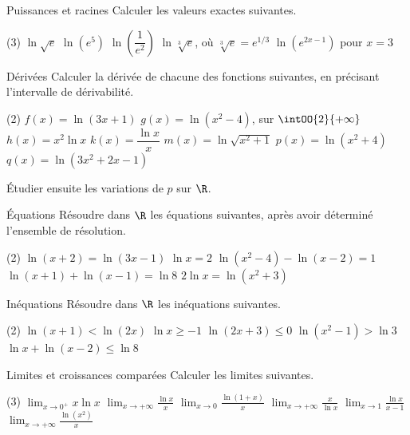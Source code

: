 \begin{exercice}[1]{Puissances et racines}
Calculer les valeurs exactes suivantes.
\begin{tasks}(3)
  \task $\ln\sqrt e$
  \task $\ln\left(e^{5}\right)$
  \task $\ln\left(\dfrac{1}{e^{2}}\right)$
  \task $\ln\sqrt[3]{e}$, où ${\sqrt[3]{e}=e^{1/3}}$
  \task $\ln\left(e^{2x-1}\right)$ pour $x=3$
\end{tasks}
\end{exercice}


\begin{exercice}[2]{Dérivées}
Calculer la dérivée de chacune des fonctions suivantes, en précisant l'intervalle de dérivabilité.
\begin{tasks}(2)
  \task $f(x)=\ln(3x+1)$
  \task $g(x)=\ln\left(x^{2}-4\right)$, sur $\intOO{2}{+\infty}$
  \task $h(x)=x^{2}\ln x$
  \task $k(x)=\dfrac{\ln x}{x}$
  \task $m(x)=\ln\sqrt{x^{2}+1}$
  \task $p(x)=\ln\left(x^{2}+4\right)$
  \task $q(x)=\ln\left(3x^{2}+2x-1\right)$
\end{tasks}
Étudier ensuite les variations de $p$ sur $\R$.
\end{exercice}

\begin{exercice}[2]{Équations}
Résoudre dans $\R$ les équations suivantes, après avoir déterminé l'ensemble de résolution.
\begin{tasks}(2)
  \task $\ln(x+2)=\ln(3x-1)$
  \task $\ln x=2$
  \task $\ln\left(x^{2}-4\right)-\ln(x-2)=1$
  \task $\ln(x+1)+\ln(x-1)=\ln8$
  \task $2\ln x=\ln\left(x^{2}+3\right)$
\end{tasks}
\end{exercice}

\begin{exercice}[2]{Inéquations}
Résoudre dans $\R$ les inéquations suivantes.
\begin{tasks}(2)
  \task $\ln(x+1)<\ln(2x)$
  \task $\ln x\geq-1$
  \task $\ln(2x+3)\leq0$
  \task $\ln\left(x^{2}-1\right)>\ln3$
  \task $\ln x+\ln(x-2)\leq\ln8$
\end{tasks}
\end{exercice}

\begin{exercice}[2]{Limites et croissances comparées}
Calculer les limites suivantes.
\begin{tasks}(3)
  \task $\displaystyle\lim_{x\to0^{+}}x\ln x$
  \task $\displaystyle\lim_{x\to+\infty}\frac{\ln x}{x}$
  \task $\displaystyle\lim_{x\to0}\frac{\ln(1+x)}{x}$
  \task $\displaystyle\lim_{x\to+\infty}\frac{x}{\ln x}$
  \task $\displaystyle\lim_{x\to1}\frac{\ln x}{x-1}$
  \task $\displaystyle\lim_{x\to+\infty}\frac{\ln\left(x^{2}\right)}{x}$
\end{tasks}
\end{exercice}

